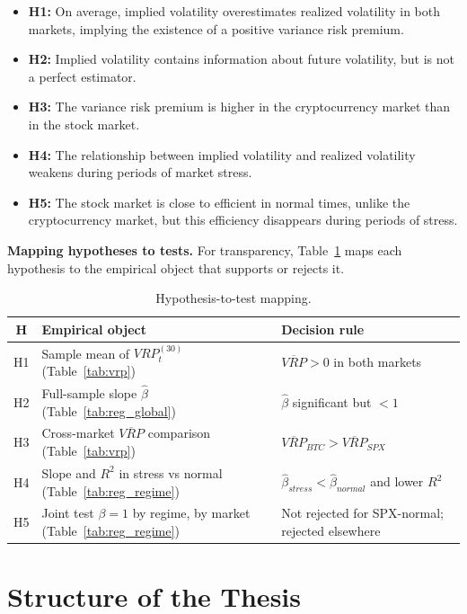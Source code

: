 \documentclass[11pt,a4paper,openany]{report}
\begin{document}
\begin{itemize}
\item \textbf{H1:} On average, implied volatility overestimates realized volatility in both markets, implying the existence of a positive variance risk premium.
\item \textbf{H2:} Implied volatility contains information about future volatility, but is not a perfect estimator.
\item \textbf{H3:} The variance risk premium is higher in the cryptocurrency market than in the stock market.
\item \textbf{H4:} The relationship between implied volatility and realized volatility weakens during periods of market stress.
\item \textbf{H5:} The stock market is close to efficient in normal times, unlike the cryptocurrency market, but this efficiency disappears during periods of stress.
\end{itemize}

\textbf{Mapping hypotheses to tests.} For transparency,
Table~\ref{tab:h_map} maps each hypothesis to the empirical object
that supports or rejects it.

\begin{table}[H]
\centering
\caption{Hypothesis-to-test mapping.}
\label{tab:h_map}
\small
\begin{tabular}{cll}
\toprule
H & Empirical object & Decision rule \\
\midrule
H1 & Sample mean of $VRP^{(30)}_t$ (Table~\ref{tab:vrp}) & $\overline{VRP} > 0$ in both markets \\
H2 & Full-sample slope $\hat{\beta}$ (Table~\ref{tab:reg_global}) & $\hat{\beta}$ significant but $<1$ \\
H3 & Cross-market $\overline{VRP}$ comparison (Table~\ref{tab:vrp}) & $\overline{VRP}_{BTC} > \overline{VRP}_{SPX}$ \\
H4 & Slope and $R^2$ in stress vs normal (Table~\ref{tab:reg_regime}) & $\hat{\beta}_{stress} < \hat{\beta}_{normal}$ and lower $R^2$ \\
H5 & Joint test $\beta=1$ by regime, by market (Table~\ref{tab:reg_regime}) & Not rejected for SPX-normal; rejected elsewhere \\
\bottomrule
\end{tabular}
\end{table}

\section{Structure of the Thesis}\label{structure-of-the-thesis}
\end{document}
